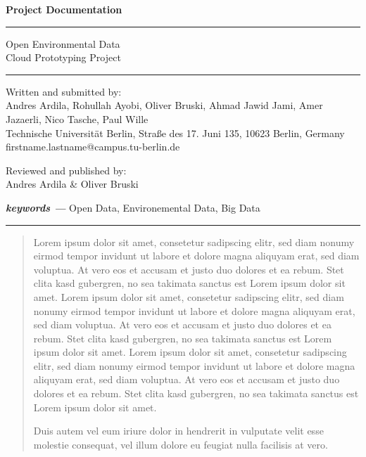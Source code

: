 \documentclass{article}
\providecommand{\keywords}[1]{\textbf{\textit{keywords ---}} #1}
\begin{document}

\thispagestyle{empty}
\begin{flushleft}
\LARGE{\bfseries Project Documentation}\\
\end{flushleft}
\rule{\textwidth}{1pt}
\vspace{2pt}
\begin{flushleft}
\Huge{Open Environmental Data} \\
\huge{Cloud Prototyping Project} \\
\end{flushleft}
\rule{\textwidth}{1pt}


\newpage
\thispagestyle{empty}
\clearpage

\begin{center}
\Large{Written and submitted by:}\\
\vspace*{2mm}
\normalsize
Andres Ardila, Rohullah Ayobi, Oliver Bruski, Ahmad Jawid Jami, Amer Jazaerli, Nico Tasche, Paul Wille\\
\vspace*{7mm}
Technische Universit\"at Berlin, Stra\ss{}e des 17. Juni 135, 10623 Berlin, Germany\\
firstname.lastname@campus.tu-berlin.de
\end{center}

\vspace*{8mm}
\begin{center}
	\Large{Reviewed and published by:}\\
	\vspace*{2mm}
	\normalsize
	Andres Ardila \& Oliver Bruski
\end{center}

\keywords{Open Data, Environemental Data, Big Data}

\vspace*{1mm}
\rule{\textwidth}{1pt}
\vspace*{1mm}

\begin{abstract}
Lorem ipsum dolor sit amet, consetetur sadipscing elitr, sed diam nonumy eirmod tempor invidunt ut labore et dolore magna aliquyam erat, sed diam voluptua. At vero eos et accusam et justo duo dolores et ea rebum. Stet clita kasd gubergren, no sea takimata sanctus est Lorem ipsum dolor sit amet. Lorem ipsum dolor sit amet, consetetur sadipscing elitr, sed diam nonumy eirmod tempor invidunt ut labore et dolore magna aliquyam erat, sed diam voluptua. At vero eos et accusam et justo duo dolores et ea rebum. Stet clita kasd gubergren, no sea takimata sanctus est Lorem ipsum dolor sit amet. Lorem ipsum dolor sit amet, consetetur sadipscing elitr, sed diam nonumy eirmod tempor invidunt ut labore et dolore magna aliquyam erat, sed diam voluptua. At vero eos et accusam et justo duo dolores et ea rebum. Stet clita kasd gubergren, no sea takimata sanctus est Lorem ipsum dolor sit amet.   

Duis autem vel eum iriure dolor in hendrerit in vulputate velit esse molestie consequat, vel illum dolore eu feugiat nulla facilisis at vero.
\end{abstract}
\newpage
\end{document}
